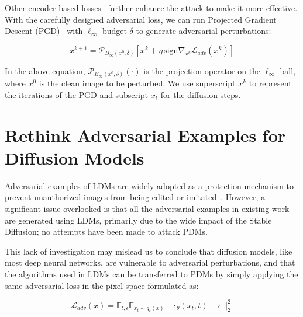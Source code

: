 \documentclass{article}
\newcommand{\chen}[1]{{\color{cyan}{#1}}}
\newcommand{\haotian}[1]{{\color{red}{#1}}}
\begin{document}
Other encoder-based losses~\cite{glaze, liang2023mist, mist-v2, sdsattack} further enhance the attack to make it more effective. With the carefully designed adversarial loss, we can run Projected Gradient Descent (PGD)~\cite{pgd} with $\ell_{\infty}$ budget $\delta$ to generate adversarial perturbations: 

\vspace{-0.4cm}
\begin{equation}\label{pgd_update}    x^{k+1} = \mathcal{P}_{B_\infty(x^0, \delta)} \left[ x^{k} + \eta\, \text{sign}\nabla_{x^k}\mathcal{L}_{adv}(x^k) \right]
\end{equation}

 In the above equation, $\mathcal{P}_{B_\infty(x^0, \delta)}(\cdot)$ is the projection operator on the $\ell_\infty$ ball, where $x^0$ is the clean image to be perturbed. We use superscript $x^k$ to represent the iterations of the PGD and subscript $x_t$ for the diffusion steps. 

    



\section{Rethink Adversarial Examples for Diffusion Models}

Adversarial examples of LDMs are widely adopted as a protection mechanism to prevent unauthorized images from being edited or imitated~\cite{glaze, liang2023mist}. However, a significant issue overlooked is that all the adversarial examples in existing work are generated using LDMs, primarily due to the wide impact of the Stable Diffusion; no attempts have been made to attack PDMs. 

This lack of investigation may mislead us to conclude that diffusion models, like most deep neural networks, are vulnerable to adversarial perturbations, and that the algorithms used in LDMs can be transferred to PDMs by simply applying the same adversarial loss in the pixel space formulated as:

\vspace{-0.4cm}
\begin{equation}\label{pixel_diffusion_adversarial_loss}
    \mathcal{L}_{adv}(x) = \mathbb{E}_{t, \epsilon} \mathbb{E}_{x_t \sim q_t(x)}\|\epsilon_{\theta}(x_t, t) -\epsilon \|_2^2
\end{equation}
\end{document}
